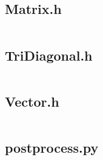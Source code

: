 \documentclass{article}
\begin{document}
\newpage
\subsection*{Matrix.h}
\inputminted[fontsize=\scriptsize]{c++}{../Matrix.h}

\newpage
\subsection*{TriDiagonal.h}
\inputminted[fontsize=\scriptsize]{c++}{../TriDiagonal.h}

\newpage
\subsection*{Vector.h}
\inputminted[fontsize=\scriptsize]{c++}{../Vector.h}

\newpage
\subsection*{postprocess.py}
\inputminted[fontsize=\scriptsize]{python}{../postprocess.py}
\end{document}
